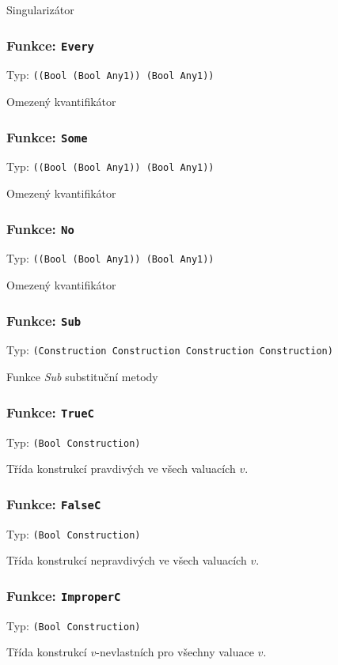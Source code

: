 Singularizátor

\subsubsection*{Funkce: \lstinline|Every|}
Typ: \lstinline|((Bool (Bool Any1)) (Bool Any1))|

Omezený kvantifikátor

\subsubsection*{Funkce: \lstinline|Some|}
Typ: \lstinline|((Bool (Bool Any1)) (Bool Any1))|

Omezený kvantifikátor

\subsubsection*{Funkce: \lstinline|No|}
Typ: \lstinline|((Bool (Bool Any1)) (Bool Any1))|

Omezený kvantifikátor

\subsubsection*{Funkce: \lstinline|Sub|}
Typ: \lstinline|(Construction Construction Construction Construction)|

Funkce \textit{Sub} substituční metody

\subsubsection*{Funkce: \lstinline|TrueC|}
Typ: \lstinline|(Bool Construction)|

Třída konstrukcí pravdivých ve všech valuacích $v$.

\subsubsection*{Funkce: \lstinline|FalseC|}
Typ: \lstinline|(Bool Construction)|

Třída konstrukcí nepravdivých ve všech valuacích $v$.

\subsubsection*{Funkce: \lstinline|ImproperC|}
Typ: \lstinline|(Bool Construction)|

Třída konstrukcí $v$-nevlastních pro všechny valuace $v$.

